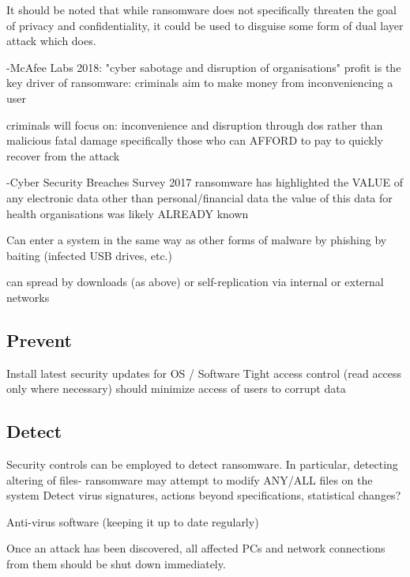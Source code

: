 \documentclass{article}
\begin{document}
It should be noted that while ransomware does not specifically threaten the goal of privacy and confidentiality, it could be used to disguise some form of dual layer attack which does.

-McAfee Labs 2018:\cite{mcafee_2018}
"cyber sabotage and disruption of organisations"
profit is the key driver of ransomware: criminals aim to make money from inconveniencing a user

criminals will focus on:
inconvenience and disruption through dos rather than malicious fatal damage
specifically those who can AFFORD to pay to quickly recover from the attack



-Cyber Security Breaches Survey 2017\cite{security_breaches_survey}
	ransomware has highlighted the VALUE of any electronic data other than personal/financial data
		the value of this data for health organisations was likely ALREADY known

Can enter a system in the same way as other forms of malware
by phishing
by baiting (infected USB drives, etc.)

can spread by downloads (as above)
or self-replication via internal or external networks

\subsection{Prevent}

Install latest security updates for OS / Software
Tight access control (read access only where necessary) should minimize access of users to corrupt data

\subsection{Detect}
Security controls can be employed to detect ransomware.
In particular, detecting altering of files- ransomware may attempt to modify ANY/ALL files on the system
Detect virus signatures, actions beyond specifications, statistical changes?

Anti-virus software (keeping it up to date regularly)

Once an attack has been discovered, all affected PCs and network connections from them should be shut down immediately.
\end{document}
